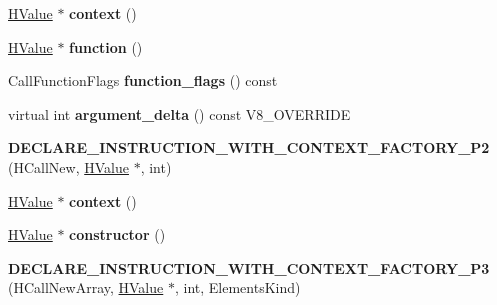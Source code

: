 \begin{DoxyCompactItemize}
\item 
\hypertarget{classv8_1_1internal_1_1_v8___f_i_n_a_l_a911a04b75b22f133c5eb5eafcc2d5f87}{}\hyperlink{classv8_1_1internal_1_1_h_value}{H\+Value} $\ast$ {\bfseries context} ()\label{classv8_1_1internal_1_1_v8___f_i_n_a_l_a911a04b75b22f133c5eb5eafcc2d5f87}

\item 
\hypertarget{classv8_1_1internal_1_1_v8___f_i_n_a_l_aafa16c84ec5aa3ee7b4f08e670d6a69f}{}\hyperlink{classv8_1_1internal_1_1_h_value}{H\+Value} $\ast$ {\bfseries function} ()\label{classv8_1_1internal_1_1_v8___f_i_n_a_l_aafa16c84ec5aa3ee7b4f08e670d6a69f}

\item 
\hypertarget{classv8_1_1internal_1_1_v8___f_i_n_a_l_aa553795dad8ceae9105cd650a558773e}{}Call\+Function\+Flags {\bfseries function\+\_\+flags} () const \label{classv8_1_1internal_1_1_v8___f_i_n_a_l_aa553795dad8ceae9105cd650a558773e}

\item 
\hypertarget{classv8_1_1internal_1_1_v8___f_i_n_a_l_a819f9fee628b487f878651a2f5b42a22}{}virtual int {\bfseries argument\+\_\+delta} () const V8\+\_\+\+O\+V\+E\+R\+R\+I\+D\+E\label{classv8_1_1internal_1_1_v8___f_i_n_a_l_a819f9fee628b487f878651a2f5b42a22}

\item 
\hypertarget{classv8_1_1internal_1_1_v8___f_i_n_a_l_ad4909623ab959b934b765b0bb5d8cb7a}{}{\bfseries D\+E\+C\+L\+A\+R\+E\+\_\+\+I\+N\+S\+T\+R\+U\+C\+T\+I\+O\+N\+\_\+\+W\+I\+T\+H\+\_\+\+C\+O\+N\+T\+E\+X\+T\+\_\+\+F\+A\+C\+T\+O\+R\+Y\+\_\+\+P2} (H\+Call\+New, \hyperlink{classv8_1_1internal_1_1_h_value}{H\+Value} $\ast$, int)\label{classv8_1_1internal_1_1_v8___f_i_n_a_l_ad4909623ab959b934b765b0bb5d8cb7a}

\item 
\hypertarget{classv8_1_1internal_1_1_v8___f_i_n_a_l_a911a04b75b22f133c5eb5eafcc2d5f87}{}\hyperlink{classv8_1_1internal_1_1_h_value}{H\+Value} $\ast$ {\bfseries context} ()\label{classv8_1_1internal_1_1_v8___f_i_n_a_l_a911a04b75b22f133c5eb5eafcc2d5f87}

\item 
\hypertarget{classv8_1_1internal_1_1_v8___f_i_n_a_l_aa595655bfd3e3ccabfe5ccc512c9d131}{}\hyperlink{classv8_1_1internal_1_1_h_value}{H\+Value} $\ast$ {\bfseries constructor} ()\label{classv8_1_1internal_1_1_v8___f_i_n_a_l_aa595655bfd3e3ccabfe5ccc512c9d131}

\item 
\hypertarget{classv8_1_1internal_1_1_v8___f_i_n_a_l_a5fafda1d7b3a781ec07d4c1c48195224}{}{\bfseries D\+E\+C\+L\+A\+R\+E\+\_\+\+I\+N\+S\+T\+R\+U\+C\+T\+I\+O\+N\+\_\+\+W\+I\+T\+H\+\_\+\+C\+O\+N\+T\+E\+X\+T\+\_\+\+F\+A\+C\+T\+O\+R\+Y\+\_\+\+P3} (H\+Call\+New\+Array, \hyperlink{classv8_1_1internal_1_1_h_value}{H\+Value} $\ast$, int, Elements\+Kind)\label{classv8_1_1internal_1_1_v8___f_i_n_a_l_a5fafda1d7b3a781ec07d4c1c48195224}


\end{DoxyCompactItemize}
